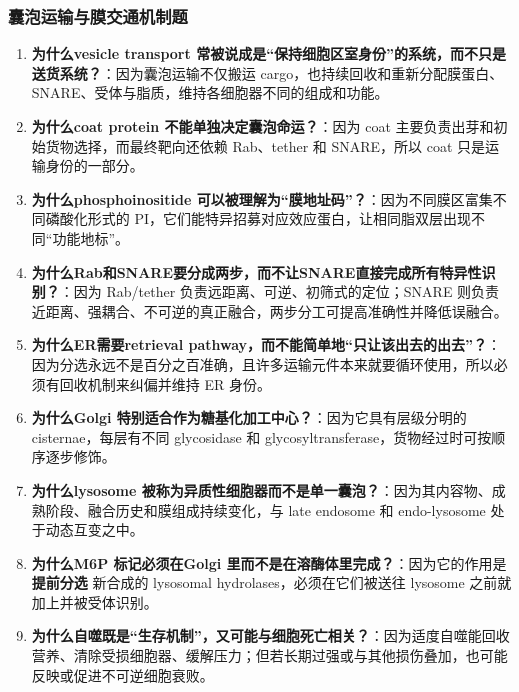 \documentclass[12pt,fontset=none]{ctexart}
\begin{document}
\subsubsection*{囊泡运输与膜交通机制题}
\begin{enumerate}
\item \textbf{为什么vesicle transport 常被说成是“保持细胞区室身份”的系统，而不只是送货系统？}：因为囊泡运输不仅搬运 cargo，也持续回收和重新分配膜蛋白、SNARE、受体与脂质，维持各细胞器不同的组成和功能。

\item \textbf{为什么coat protein 不能单独决定囊泡命运？}：因为 coat 主要负责出芽和初始货物选择，而最终靶向还依赖 Rab、tether 和 SNARE，所以 coat 只是运输身份的一部分。

\item \textbf{为什么phosphoinositide 可以被理解为“膜地址码”？}：因为不同膜区富集不同磷酸化形式的 PI，它们能特异招募对应效应蛋白，让相同脂双层出现不同“功能地标”。

\item \textbf{为什么Rab和SNARE要分成两步，而不让SNARE直接完成所有特异性识别？}：因为 Rab/tether 负责远距离、可逆、初筛式的定位；SNARE 则负责近距离、强耦合、不可逆的真正融合，两步分工可提高准确性并降低误融合。

\item \textbf{为什么ER需要retrieval pathway，而不能简单地“只让该出去的出去”？}：因为分选永远不是百分之百准确，且许多运输元件本来就要循环使用，所以必须有回收机制来纠偏并维持 ER 身份。

\item \textbf{为什么Golgi 特别适合作为糖基化加工中心？}：因为它具有层级分明的 cisternae，每层有不同 glycosidase 和 glycosyltransferase，货物经过时可按顺序逐步修饰。

\item \textbf{为什么lysosome 被称为异质性细胞器而不是单一囊泡？}：因为其内容物、成熟阶段、融合历史和膜组成持续变化，与 late endosome 和 endo-lysosome 处于动态互变之中。

\item \textbf{为什么M6P 标记必须在Golgi 里而不是在溶酶体里完成？}：因为它的作用是 \textbf{提前分选} 新合成的 lysosomal hydrolases，必须在它们被送往 lysosome 之前就加上并被受体识别。

\item \textbf{为什么自噬既是“生存机制”，又可能与细胞死亡相关？}：因为适度自噬能回收营养、清除受损细胞器、缓解压力；但若长期过强或与其他损伤叠加，也可能反映或促进不可逆细胞衰败。


\end{enumerate}
\end{document}
